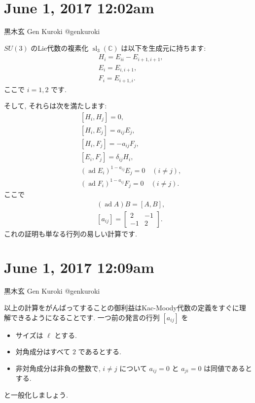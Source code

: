 \documentclass[12pt,twoside]{jarticle}
\newcommand\ad{\operatorname{ad}}
\theoremstyle{jplain}
\theoremstyle{jplain}
\theoremstyle{jplain}
\numberwithin{theorem}{section}
\numberwithin{equation}{section}
\numberwithin{figure}{section}
\numberwithin{table}{section}
\begin{document}
\section{ June  1, 2017 12:02am}








黒木玄 Gen Kuroki
@genkuroki


$SU(3)$ のLie代数の複素化 $\operatorname{sl}_3(\mathbb C)$ は以下を生成元に持ちます:\begin{align*}&H_i=E_{ii}-E_{i+1,i+1},\\&E_i=E_{i,i+1},\\&F_i=E_{i+1,i}.\end{align*}ここで $i=1,2$ です. 

そして, それらは次を満たします:\begin{align*}&[H_i,H_j]=0,\\&[H_i,E_j]=a_{ij}E_j,\\&[H_i,F_j]=-a_{ij}F_j,\\&[E_i,F_j]=\delta_{ij}H_i,\\&(\ad E_i)^{1-a_{ij}}E_j=0 \quad(i\ne j),\\&(\ad F_i)^{1-a_{ij}}F_j=0 \quad(i\ne j).\end{align*}ここで\begin{align*}&(\ad A)B=[A,B],\\& [a_{ij}]=\begin{bmatrix}2&-1\\ -1&2\end{bmatrix}.\end{align*}これの証明も単なる行列の易しい計算です. 









\section{ June  1, 2017 12:09am}


黒木玄 Gen Kuroki
@genkuroki

以上の計算をがんばってすることの御利益はKac-Moody代数の定義をすぐに理解できるようになることです. 一つ前の発言の行列 $[a_{ij}]$ を
\begin{itemize}
\item サイズは $\ell$ とする. 
\item 対角成分はすべて $2$ であるとする. 
\item 非対角成分は非負の整数で, $i\ne j$ について $a_{ij}=0$ と $a_{ji}=0$ は同値であるとする. 
\end{itemize}
と一般化しましょう. 
\end{document}
